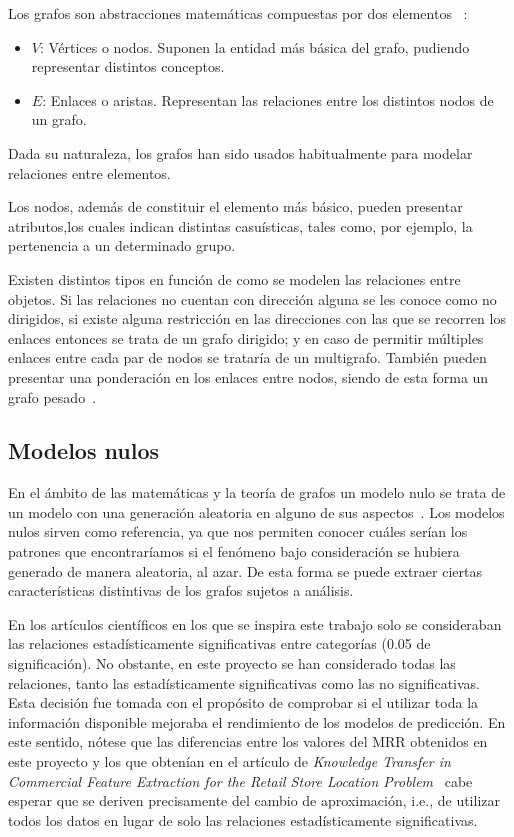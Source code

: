 Los grafos son abstracciones matemáticas compuestas por dos elementos ~\cite{enwiki:1171835383}:

\begin{itemize}
	\item $V$: Vértices o nodos. Suponen la entidad más básica del grafo, pudiendo representar distintos conceptos.
	\item $E$: Enlaces o aristas. Representan las relaciones entre los distintos nodos de un grafo.
\end{itemize}

Dada su naturaleza, los grafos han sido usados habitualmente para modelar relaciones entre elementos.

Los nodos, además de constituir el elemento más básico, pueden presentar atributos,los cuales indican distintas casuísticas, tales como, por ejemplo, la pertenencia a un determinado grupo.

Existen distintos tipos en función de como se modelen las relaciones entre objetos. Si las relaciones no cuentan con dirección alguna se les conoce como no dirigidos, si existe alguna restricción en las direcciones con las que se recorren los enlaces entonces se trata de un grafo dirigido; y en caso de permitir múltiples enlaces entre cada par de nodos se trataría de un multigrafo. También pueden presentar una ponderación en los enlaces entre nodos, siendo de esta forma un grafo pesado~\cite{enwiki:1171835383}.

\subsection{Modelos nulos}

En el ámbito de las matemáticas y la teoría de grafos un modelo nulo se trata de un modelo con una generación aleatoria en alguno de sus aspectos~\cite{enwiki:1169838323}. Los modelos nulos sirven como referencia, ya que nos permiten conocer cuáles serían los patrones que encontraríamos si el fenómeno bajo consideración se hubiera generado de manera aleatoria, al azar. De esta forma se puede extraer ciertas características distintivas de los grafos sujetos a análisis.

En los artículos científicos en los que se inspira este trabajo solo se consideraban las relaciones estadísticamente significativas entre categorías (0.05 de significación). No obstante, en este proyecto se han considerado todas las relaciones, tanto las estadísticamente significativas como las no significativas. Esta decisión fue tomada con el propósito de comprobar si el utilizar toda la información disponible mejoraba el rendimiento de los modelos de predicción. En este sentido, nótese que las diferencias entre los valores del MRR obtenidos en este proyecto y los que obtenían en el artículo de \textit{Knowledge Transfer in Commercial Feature Extraction for the Retail Store Location Problem}~\cite{Ahedo2021} cabe esperar que se deriven precisamente del cambio de aproximación, i.e., de utilizar todos los datos en lugar de solo las relaciones estadísticamente significativas.

